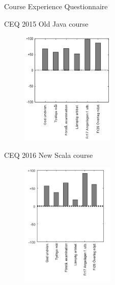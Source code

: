 \documentclass{lecturenotes}
\begin{document}
\begin{Slide}{Course Experience Questionnaire}
\begin{multicols}{2}

CEQ 2015 Old Java course
\begin{figure}
\includegraphics[width=0.4\textwidth]{img/CEQ-2015}
\end{figure}
\columnbreak

CEQ 2016 New Scala course

\begin{figure}
\includegraphics[width=0.4\textwidth]{img/CEQ-2016}
\end{figure}

\end{multicols}
\end{Slide}
\end{document}
